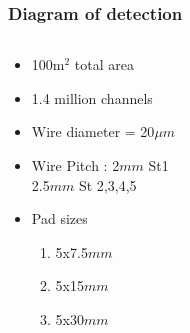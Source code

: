 \documentclass{beamer}
\begin{document}
\begin{frame}
  \frametitle{Diagram of detection}

\begin{columns}[T] %
\begin{column}{.48\textwidth}
\begin{itemize}
  \item 100m$^2$ total area
  \item 1.4 million channels
  \item Wire diameter = 20$\mu m$
  \item Wire Pitch : 2$mm$ St1\\
    2.5$mm$ St 2,3,4,5
  \item Pad sizes \\
    \begin{enumerate}
      \item 5x7.5$mm$
      \item 5x15$mm$
      \item 5x30$mm$
    \end{enumerate}
\end{itemize}

\end{column}%
\hfill%
\begin{column}{.48\textwidth}

\end{column}%
\end{columns}  
  
  
  
\end{frame}
\end{document}
